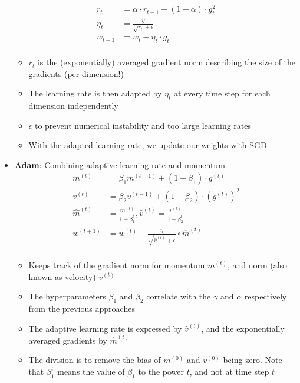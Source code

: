 \begin{itemize}
	\begin{equation*}
		\begin{split}
			r_t & = \alpha \cdot r_{t-1} + \left(1 - \alpha\right) \cdot g_t^2\\
			\eta_t & = \frac{\eta}{\sqrt{r_t} + \epsilon} \\
			w_{t+1} & = w_{t} - \eta_t \cdot g_t\\
		\end{split}
	\end{equation*}
	\begin{itemize}
		\item $r_t$ is the (exponentially) averaged gradient norm describing the size of the gradients (per dimension!)
		\item The learning rate is then adapted by $\eta_t$ at every time step for each dimension independently
		\item $\epsilon$ to prevent numerical instability and too large learning rates
		\item With the adapted learning rate, we update our weights with SGD
	\end{itemize}
	\item \textbf{Adam}: Combining adaptive learning rate and momentum
	\begin{equation*}
		\begin{split}
			m^{(t)} & = \beta_1 m^{(t-1)} + (1 - \beta_1)\cdot g^{(t)}\\
			v^{(t)} & = \beta_2 v^{(t-1)} + (1 - \beta_2)\cdot \left(g^{(t)}\right)^2\\
			\hat{m}^{(t)} & = \frac{m^{(t)}}{1-\beta^{t}_1}, \hat{v}^{(t)} = \frac{v^{(t)}}{1-\beta^{t}_2}\\
			w^{(t+1)} & = w^{(t)} - \frac{\eta}{\sqrt{\hat{v}^{(t)}} + \epsilon}\circ \hat{m}^{(t)}\\
		\end{split}
	\end{equation*}
	\begin{itemize}
		\item Keeps track of the gradient norm for momentum $m^{(t)}$, and norm (also known as velocity) $v^{(t)}$
		\item The hyperparameters $\beta_1$ and $\beta_2$ correlate with the $\gamma$ and $\alpha$ respectively from the previous approaches
		\item The adaptive learning rate is expressed by $\hat{v}^{(t)}$, and the exponentially averaged gradients by $\hat{m}^{(t)}$
		\item The division is to remove the bias of $m^{(0)}$ and $v^{(0)}$ being zero. Note that $\beta_1^t$ means the value of $\beta_1$ to the power $t$, and not at time step $t$

\end{itemize}
\end{itemize}
